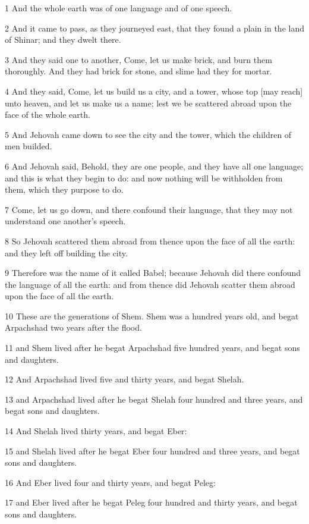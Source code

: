 \par 1 And the whole earth was of one language and of one speech.
\par 2 And it came to pass, as they journeyed east, that they found a plain in the land of Shinar; and they dwelt there.
\par 3 And they said one to another, Come, let us make brick, and burn them thoroughly. And they had brick for stone, and slime had they for mortar.
\par 4 And they said, Come, let us build us a city, and a tower, whose top [may reach] unto heaven, and let us make us a name; lest we be scattered abroad upon the face of the whole earth.
\par 5 And Jehovah came down to see the city and the tower, which the children of men builded.
\par 6 And Jehovah said, Behold, they are one people, and they have all one language; and this is what they begin to do: and now nothing will be withholden from them, which they purpose to do.
\par 7 Come, let us go down, and there confound their language, that they may not understand one another's speech.
\par 8 So Jehovah scattered them abroad from thence upon the face of all the earth: and they left off building the city.
\par 9 Therefore was the name of it called Babel; because Jehovah did there confound the language of all the earth: and from thence did Jehovah scatter them abroad upon the face of all the earth.
\par 10 These are the generations of Shem. Shem was a hundred years old, and begat Arpachshad two years after the flood.
\par 11 and Shem lived after he begat Arpachshad five hundred years, and begat sons and daughters.
\par 12 And Arpachshad lived five and thirty years, and begat Shelah.
\par 13 and Arpachshad lived after he begat Shelah four hundred and three years, and begat sons and daughters.
\par 14 And Shelah lived thirty years, and begat Eber:
\par 15 and Shelah lived after he begat Eber four hundred and three years, and begat sons and daughters.
\par 16 And Eber lived four and thirty years, and begat Peleg:
\par 17 and Eber lived after he begat Peleg four hundred and thirty years, and begat sons and daughters.

